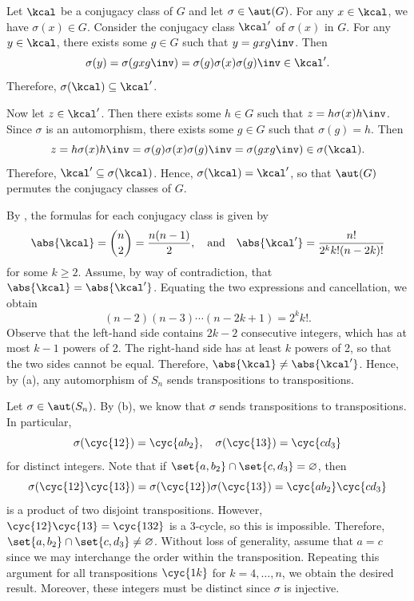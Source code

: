 \begin{solenum}
	\item Let $\kcal$ be a conjugacy class of $G$ and let $\sigma \in \aut(G)$.
	For any $x \in \kcal$, we have $\sigma(x) \in G$.
	Consider the conjugacy class $\kcal'$ of $\sigma(x)$ in $G$.
	For any $y \in \kcal$, there exists some $g \in G$ such that $y = gxg\inv$.
	Then
	\[
		\sigma(y) = \sigma(gxg\inv) = \sigma(g)\sigma(x)\sigma(g)\inv \in \kcal'.
	\]
	Therefore, $\sigma(\kcal) \subseteq \kcal'$.

	Now let $z \in \kcal'$.
	Then there exists some $h \in G$ such that $z = h\sigma(x)h\inv$.
	Since $\sigma$ is an automorphism, there exists some $g \in G$ such that $\sigma(g) = h$.
	Then
	\[
		z = h\sigma(x)h\inv = \sigma(g)\sigma(x)\sigma(g)\inv = \sigma(gxg\inv) \in \sigma(\kcal).
	\]
	Therefore, $\kcal' \subseteq \sigma(\kcal)$.
	Hence, $\sigma(\kcal) = \kcal'$, so that $\aut(G)$ permutes the conjugacy classes of $G$.
	\item By , the formulas for each conjugacy class is given by
	\[
		\abs{\kcal} = \binom n2 = \frac{n(n - 1)}{2}, \quad \text{and} \quad \abs{\kcal'} = \frac{n!}{2^k k! (n - 2k)!}
	\]
	for some $k \geq 2$.
	Assume, by way of contradiction, that $\abs{\kcal} = \abs{\kcal'}$.
	Equating the two expressions and cancellation, we obtain
	\[
		(n - 2)(n - 3) \cdots (n - 2k + 1) = 2^k k!.
	\]
	Observe that the left-hand side contains $2k - 2$ consecutive integers, which has at most $k - 1$ powers of 2.
	The right-hand side has at least $k$ powers of 2, so that the two sides cannot be equal.
	Therefore, $\abs{\kcal} \neq \abs{\kcal'}$.
	Hence, by (a), any automorphism of $S_n$ sends transpositions to transpositions.
	\item Let $\sigma \in \aut(S_n)$.
	By (b), we know that $\sigma$ sends transpositions to transpositions.
	In particular,
	\[
		\sigma(\cyc{1 2}) = \cyc{a b_2}, \quad \sigma(\cyc{1 3}) = \cyc{c d_3}
	\]
	for distinct integers.
	Note that if $\set{a, b_2} \cap \set{c, d_3} = \varnothing$, then
	\[
		\sigma(\cyc{1 2}\cyc{1 3}) = \sigma(\cyc{1 2})\sigma(\cyc{1 3}) = \cyc{a b_2}\cyc{c d_3}
	\]
	is a product of two disjoint transpositions.
	However, $\cyc{1 2}\cyc{1 3} = \cyc{1 3 2}$ is a 3-cycle, so this is impossible.
	Therefore, $\set{a, b_2} \cap \set{c, d_3} \neq \varnothing$.
	Without loss of generality, assume that $a = c$ since we may interchange the order within the transposition.
	Repeating this argument for all transpositions $\cyc{1 k}$ for $k = 4, \ldots, n$, we obtain the desired result.
	Moreover, these integers must be distinct since $\sigma$ is injective.

\end{solenum}
